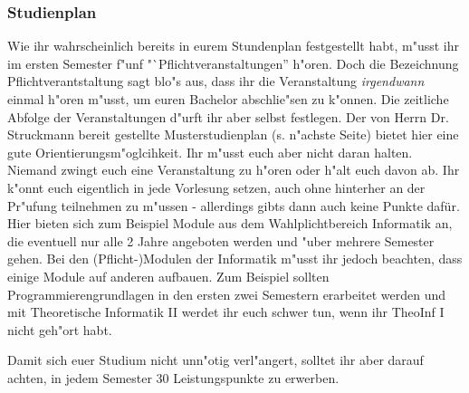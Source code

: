 \subsubsection{Studienplan}
\label{bach_studienplan}
Wie ihr wahrscheinlich bereits in eurem Stundenplan festgestellt habt, m"usst ihr im ersten Semester f"unf "`Pflichtveranstaltungen'' h"oren.
Doch die Bezeichnung Pflichtverantstaltung sagt blo"s aus, dass ihr die Veranstaltung \emph{irgendwann} einmal h"oren m"usst, um euren Bachelor abschlie"sen zu k"onnen.
Die zeitliche Abfolge der Veranstaltungen d"urft ihr aber selbst festlegen.
Der von Herrn Dr. Struckmann bereit gestellte Musterstudienplan (s. n"achste Seite) bietet hier eine gute Orientierungsm"oglcihkeit.
Ihr m"usst euch aber nicht daran halten. Niemand zwingt euch eine Veranstaltung zu h"oren oder h"alt euch davon ab.
Ihr k"onnt euch eigentlich in jede Vorlesung setzen, auch ohne hinterher an der Pr"ufung teilnehmen zu m"ussen - allerdings gibts dann auch keine Punkte dafür.
Hier bieten sich zum Beispiel Module aus dem Wahlplichtbereich Informatik an, die eventuell nur alle 2 Jahre angeboten werden und "uber mehrere Semester gehen.
Bei den (Pflicht-)Modulen der Informatik m"usst ihr jedoch beachten, dass einige Module auf anderen aufbauen.
Zum Beispiel sollten Programmierengrundlagen in den ersten zwei Semestern erarbeitet werden und mit Theoretische Informatik II werdet ihr euch schwer tun, wenn ihr TheoInf I nicht geh"ort habt.

Damit sich euer Studium nicht unn"otig verl"angert, solltet ihr aber darauf achten, in jedem Semester 30 Leistungspunkte zu erwerben. 



